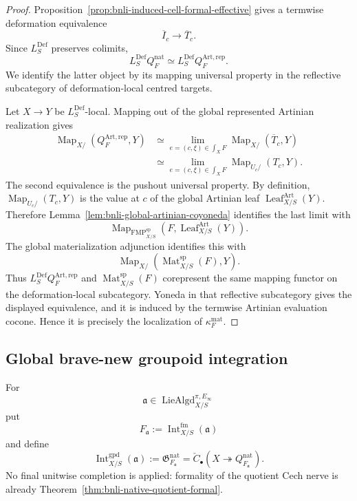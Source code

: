 \begin{proof}
Proposition~\ref{prop:bnli-induced-cell-formal-effective} gives a termwise
deformation equivalence
\[
    \overline I_c\longrightarrow\overline T_c.
\]
Since $L_S^{\mathrm{Def}}$ preserves colimits,
\[
    L_S^{\mathrm{Def}}Q_F^{\mathrm{nat}}
    \simeq
    L_S^{\mathrm{Def}}Q_F^{\mathrm{Art,rep}}.
\]
We identify the latter object by its mapping universal property in the
reflective subcategory of deformation-local centred targets.

Let $X\to Y$ be $L_S^{\mathrm{Def}}$-local.  Mapping out of the global
represented Artinian realization gives
\[
\begin{aligned}
    \operatorname{Map}_{X/}(Q_F^{\mathrm{Art,rep}},Y)
    &\simeq
    \operatorname*{lim}_{e=(c,\xi)\in\int_XF}
    \operatorname{Map}_{X/}(\overline T_c,Y)\\
    &\simeq
    \operatorname*{lim}_{e=(c,\xi)\in\int_XF}
    \operatorname{Map}_{U_c/}(T_c,Y).
\end{aligned}
\]
The second equivalence is the pushout universal property.  By definition,
$\operatorname{Map}_{U_c/}(T_c,Y)$ is the value at $c$ of the global Artinian
leaf $\operatorname{Leaf}^{\mathrm{Art}}_{X/S}(Y)$.  Therefore
Lemma~\ref{lem:bnli-global-artinian-coyoneda} identifies the last limit with
\[
    \operatorname{Map}_{\operatorname{FMP}^{\mathrm{sp}}_{X/S}}
    \left(
      F,\operatorname{Leaf}^{\mathrm{Art}}_{X/S}(Y)
    \right).
\]
The global materialization adjunction identifies this with
\[
    \operatorname{Map}_{X/}
    \left(
      \operatorname{Mat}^{\mathrm{sp}}_{X/S}(F),Y
    \right).
\]
Thus $L_S^{\mathrm{Def}}Q_F^{\mathrm{Art,rep}}$ and
$\operatorname{Mat}^{\mathrm{sp}}_{X/S}(F)$ corepresent the same mapping functor
on the deformation-local subcategory.  Yoneda in that reflective subcategory
gives the displayed equivalence, and it is induced by the termwise Artinian
evaluation cocone.  Hence it is precisely the localization of
$\kappa_F^{\mathrm{mat}}$.
\end{proof}

\subsection{Global brave-new groupoid integration}

\begin{definition}
\label{def:bnli-integration}
For
\[
    \mathfrak a\in\operatorname{LieAlgd}^{\pi,E_\infty}_{X/S}
\]
put
\[
    F_{\mathfrak a}
    :=
    \operatorname{Int}^{\mathrm{fm}}_{X/S}(\mathfrak a)
\]
and define
\[
\boxed{
    \operatorname{Int}^{\mathrm{gpd}}_{X/S}(\mathfrak a)
    :=
    \mathfrak G_{F_{\mathfrak a}}^{\mathrm{nat}}
    =
    \check C_\bullet
    \left(
      X\twoheadrightarrow Q_{F_{\mathfrak a}}^{\mathrm{nat}}
    \right).}
\]
No final unitwise completion is applied: formality of the quotient Cech nerve
is already Theorem~\ref{thm:bnli-native-quotient-formal}.
\end{definition}

